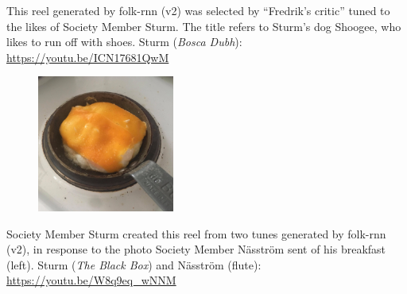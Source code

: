 \documentclass[a4paper,notitlepage,twoside]{book}
\begin{document}
\clearpage
{}
{}  
  
\hypertarget{reel:ShoogeeTakeAnotherShoe}{}
This reel generated by folk-rnn (v2) was selected by ``Fredrik's critic'' 
tuned to the likes of Society Member Sturm.
The title refers to Sturm's dog Shoogee,
who likes to run off with shoes. 
Sturm ({\em Bosca Dubh}): \url{https://youtu.be/ICN17681QwM}

{}  
  
\hypertarget{reel:DresstheEggwithaHat}{}
\begin{figure}
\vspace{-0.3in}
\includegraphics[width=0.4\textwidth]{eggwithahat.jpg}
\end{figure}
Society Member Sturm created this reel from 
two tunes generated by folk-rnn (v2),
in response to the photo Society Member Näsström
sent of his breakfast (left).
Sturm ({\em The Black Box}) and Näsström (flute): \url{https://youtu.be/W8q9eq_wNNM}

\clearpage
\end{document}
